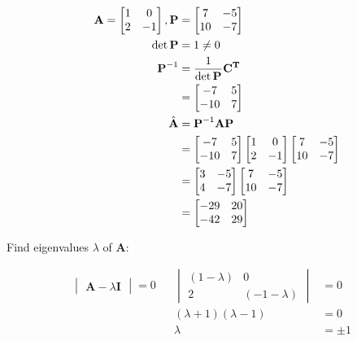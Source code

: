 \documentclass{article}
\begin{document}
\begin{align}
    \label{eq:1}
    && \textbf{A} = \begin{bmatrix}
    1&0 \\ 2 & -1
    \end{bmatrix}, \textbf{P} &= \begin{bmatrix} 7 & -5\\ 10 & -7 \end{bmatrix}
    \\
    \label{eq:2}
    && \det\textbf{P} &= 1 \neq 0
    \\
    \label{eq:3}
    && \textbf{P}^{-1} &= \frac{1}{\det\textbf{P}}\textbf{C\textsuperscript{T}}
    \\
    \label{eq:4}
    && &= \begin{bmatrix}
    -7 & 5\\
    -10 & 7
    \end{bmatrix}
    \\
    \label{eq:5}
    && \hat{\textbf{A}} &= \textbf{P}^{-1} \textbf{AP}
    \\
    \label{eq:6}
    && &= \begin{bmatrix}
    -7 & 5\\
    -10 & 7
    \end{bmatrix} \begin{bmatrix}
    1&0 \\ 2 & -1
    \end{bmatrix} \begin{bmatrix} 7 & -5\\ 10 & -7 \end{bmatrix}
    \\
    \label{eq:7}
    && &= \begin{bmatrix}
    3 & -5\\ 4 & -7
    \end{bmatrix} \begin{bmatrix} 7 & -5\\ 10 & -7 \end{bmatrix}
    \\
    \label{eq:8}
    && &= \begin{bmatrix}
    -29 & 20\\
    -42 & 29
    \end{bmatrix}
\end{align}

Find eigenvalues $\lambda$ of \textbf{A}:

\begin{align}
    \label{eq:9}
    \begin{vmatrix}
    \textbf{A} - \lambda\textbf{I}
    \end{vmatrix} = 0
    && \begin{vmatrix}
    (1-\lambda) & 0\\ 2 & (-1-\lambda)
    \end{vmatrix} &= 0
    \\
    \label{eq:10}
    && (\lambda+1)(\lambda-1) &= 0
    \\
    \label{eq:11}
    && \lambda &= \pm 1
\end{align}
\end{document}
